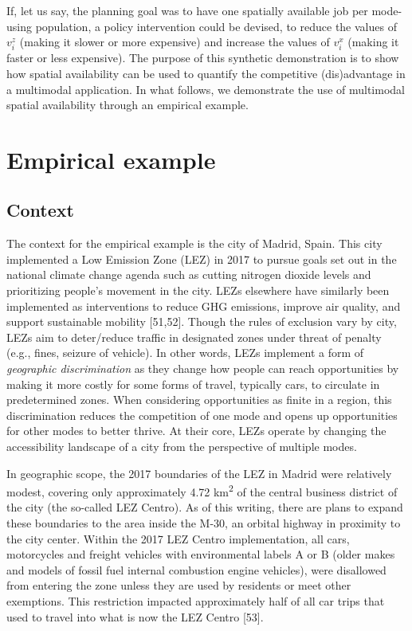 \documentclass[10pt,letterpaper]{article}
\begin{document}
If, let us say, the planning goal was to have one spatially available
job per mode-using population, a policy intervention could be devised,
to reduce the values of \(v_i^z\) (making it slower or more expensive)
and increase the values of \(v_i^x\) (making it faster or less
expensive). The purpose of this synthetic demonstration is to show how
spatial availability can be used to quantify the competitive
(dis)advantage in a multimodal application. In what follows, we
demonstrate the use of multimodal spatial availability through an
empirical example.

\hypertarget{empirical-example}{%
\section{Empirical example}\label{empirical-example}}

\hypertarget{context}{%
\subsection{Context}\label{context}}

The context for the empirical example is the city of Madrid, Spain. This
city implemented a Low Emission Zone (LEZ) in 2017 to pursue goals set
out in the national climate change agenda such as cutting nitrogen
dioxide levels and prioritizing people's movement in the city. LEZs
elsewhere have similarly been implemented as interventions to reduce GHG
emissions, improve air quality, and support sustainable mobility
{[}51,52{]}. Though the rules of exclusion vary by city, LEZs aim to
deter/reduce traffic in designated zones under threat of penalty (e.g.,
fines, seizure of vehicle). In other words, LEZs implement a form of
\emph{geographic discrimination} as they change how people can reach
opportunities by making it more costly for some forms of travel,
typically cars, to circulate in predetermined zones. When considering
opportunities as finite in a region, this discrimination reduces the
competition of one mode and opens up opportunities for other modes to
better thrive. At their core, LEZs operate by changing the accessibility
landscape of a city from the perspective of multiple modes.

In geographic scope, the 2017 boundaries of the LEZ in Madrid were
relatively modest, covering only approximately 4.72
km\textsuperscript{2} of the central business district of the city (the
so-called LEZ Centro). As of this writing, there are plans to expand
these boundaries to the area inside the M-30, an orbital highway in
proximity to the city center. Within the 2017 LEZ Centro implementation,
all cars, motorcycles and freight vehicles with environmental labels A
or B (older makes and models of fossil fuel internal combustion engine
vehicles), were disallowed from entering the zone unless they are used
by residents or meet other exemptions. This restriction impacted
approximately half of all car trips that used to travel into what is now
the LEZ Centro {[}53{]}.
\end{document}
